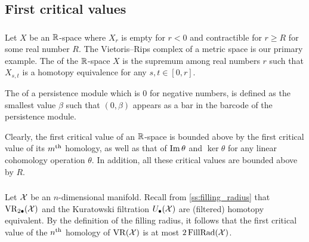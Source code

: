 
\subsection{First critical values}\label{sub:general_barcodes}


\subsubsection{}\label{subsub:first_critical_value}\label{subsub:beta v.s. fillrad}

Let $X$ be an $\mathbb{R}$-space where $X_r$ is empty for $r<0$ and contractible for $r \geq R$ for some real number $R$.
The Vietoris--Rips complex of a metric space is our primary example.
The  of the $\mathbb{R}$-space $X$ is the supremum among real numbers $r$ such that $X_{s,t}$ is a homotopy equivalence for any $s,t \in [0,r]$. 


The  of a persistence module which is \(0\) for negative numbers, is defined as the smallest value \(\beta\) such that \((0, \beta)\) appears as a bar in the barcode of the persistence module.

Clearly, the first critical value of an $\mathbb{R}$-space is bounded above by the first critical value of its $m^{\mathrm{th}}$ homology, as well as that of \(\operatorname{Im}\theta\) and \(\ker\theta\) for any linear cohomology operation $\theta$.
In addition, all these critical values are bounded above by $R$.

\subsubsection{}

Let $\mathcal{X}$ be an $n$-dimensional manifold.
Recall from \cref{ss:filling_radius} that $\operatorname{VR}_{2\bullet}(\mathcal{X})$ and the Kuratowski filtration $U_\bullet(\mathcal{X})$ are (filtered) homotopy equivalent.
By the definition of the filling radius, it follows that the first critical value of the $n^{\mathrm{th}}$ homology of $\operatorname{VR}(\mathcal{X})$ is at most $2\operatorname{FillRad}(\mathcal{X})$.

